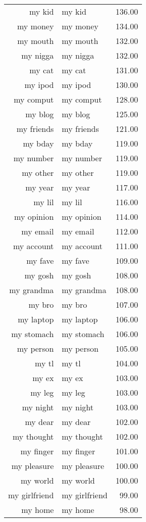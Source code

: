 \begin{table}[ht]
\begin{tabular}{rlr}
  my kid & my kid & 136.00 \\ 
  my money & my money & 134.00 \\ 
  my mouth & my mouth & 132.00 \\ 
  my nigga & my nigga & 132.00 \\ 
  my cat & my cat & 131.00 \\ 
  my ipod & my ipod & 130.00 \\ 
  my comput & my comput & 128.00 \\ 
  my blog & my blog & 125.00 \\ 
  my friends & my friends & 121.00 \\ 
  my bday & my bday & 119.00 \\ 
  my number & my number & 119.00 \\ 
  my other & my other & 119.00 \\ 
  my year & my year & 117.00 \\ 
  my lil & my lil & 116.00 \\ 
  my opinion & my opinion & 114.00 \\ 
  my email & my email & 112.00 \\ 
  my account & my account & 111.00 \\ 
  my fave & my fave & 109.00 \\ 
  my gosh & my gosh & 108.00 \\ 
  my grandma & my grandma & 108.00 \\ 
  my bro & my bro & 107.00 \\ 
  my laptop & my laptop & 106.00 \\ 
  my stomach & my stomach & 106.00 \\ 
  my person & my person & 105.00 \\ 
  my tl & my tl & 104.00 \\ 
  my ex & my ex & 103.00 \\ 
  my leg & my leg & 103.00 \\ 
  my night & my night & 103.00 \\ 
  my dear & my dear & 102.00 \\ 
  my thought & my thought & 102.00 \\ 
  my finger & my finger & 101.00 \\ 
  my pleasure & my pleasure & 100.00 \\ 
  my world & my world & 100.00 \\ 
  my girlfriend & my girlfriend & 99.00 \\ 
  my home & my home & 98.00 \\ 

\end{tabular}
\end{table}
